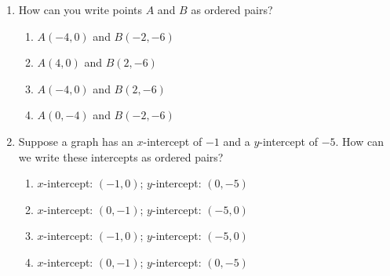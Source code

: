 \documentclass{article}
\begin{document}
\begin{enumerate}



\item How can you write points $A$ and $B$ as ordered pairs?
\begin{center}
\end{center}

  \begin{enumerate}
  
  \item $A(-4,0)$ and $B(-2,-6)$  
  \item $A(4,0)$ and $B(2,-6)$
  \item $A(-4,0)$ and $B(2,-6)$ %
  \item $A(0,-4)$ and $B(-2,-6)$
  
  \end{enumerate}


\item Suppose a graph has an $x$-intercept of $-1$ and a $y$-intercept of $-5$. How can we write these intercepts as ordered pairs?

  \begin{enumerate}
  \item $x$-intercept: $(-1,0)$; $y$-intercept: $(0,-5)$ %
  \item $x$-intercept: $(0,-1)$; $y$-intercept: $(-5,0)$
  \item $x$-intercept: $(-1,0)$; $y$-intercept: $(-5,0)$
  \item $x$-intercept: $(0,-1)$; $y$-intercept: $(0,-5)$
  \end{enumerate}



\end{enumerate}
\end{document}
